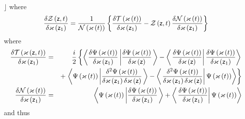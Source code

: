 $\rfloor $ where 
\begin{equation}
\frac{\delta {\cal Z}\left( {\sf z},t\right) }{\delta \varkappa \left( {\sf z%
}_{1}\right) }=\frac{1}{{\cal N}\left( {\cal \varkappa }\left( t\right)
\right) }\left\{ \frac{\delta {\cal T}\left( \varkappa \left( t\right)
\right) }{\delta \varkappa \left( {\sf z}_{1}\right) }-{\cal Z}\left( {\sf z}%
,t\right) \frac{\delta {\cal N}\left( \varkappa \left( t\right) \right) }{%
\delta \varkappa \left( {\sf z}_{1}\right) }\right\} 
\end{equation}%
where 
\begin{eqnarray}
\frac{\delta {\cal T}\left( \varkappa \left( {\sf z},t\right) \right) }{%
\delta \varkappa \left( {\sf z}_{1}\right) } &=&\frac{i}{2}\left\{
\left\langle \frac{\delta \Psi \left( {\cal \varkappa }\left( t\right)
\right) }{\delta {\cal \varkappa }\left( {\sf z}_{1}\right) }\left| \frac{%
\delta \Psi \left( {\cal \varkappa }\left( t\right) \right) }{\delta {\cal %
\varkappa }\left( {\sf z}\right) }\right. \right\rangle -\left\langle \left. 
\frac{\delta \Psi \left( {\cal \varkappa }\left( t\right) \right) }{\delta 
{\cal \varkappa }\left( {\sf z}\right) }\right| \frac{\delta \Psi \left( 
{\cal \varkappa }\left( t\right) \right) }{\delta {\cal \varkappa }\left( 
{\sf z}_{1}\right) }\right\rangle \right.  \\
&&+\left. \left\langle \Psi \left( {\cal \varkappa }\left( t\right) \right)
\left| \frac{\delta ^{2}\Psi \left( {\cal \varkappa }\left( t\right) \right) 
}{\delta {\cal \varkappa }\left( {\sf z}_{1}\right) \delta {\cal \varkappa }%
\left( {\sf z}\right) }\right. \right\rangle -\left\langle \left. \frac{%
\delta ^{2}\Psi \left( {\cal \varkappa }\left( t\right) \right) }{\delta 
{\cal \varkappa }\left( {\sf z}_{1}\right) \delta {\cal \varkappa }\left( 
{\sf z}\right) }\right| \Psi \left( {\cal \varkappa }\left( t\right) \right)
\right\rangle \right\}  \\
\frac{\delta {\cal N}\left( \varkappa \left( t\right) \right) }{\delta
\varkappa \left( {\sf z}_{1}\right) } &=&\left\langle \Psi \left( {\cal %
\varkappa }\left( t\right) \right) \left| \frac{\delta \Psi \left( {\cal %
\varkappa }\left( t\right) \right) }{\delta {\cal \varkappa }\left( {\sf z}%
_{1}\right) }\right. \right\rangle +\left\langle \left. \frac{\delta \Psi
\left( {\cal \varkappa }\left( t\right) \right) }{\delta {\cal \varkappa }%
\left( {\sf z}_{1}\right) }\right| \Psi \left( {\cal \varkappa }\left(
t\right) \right) \right\rangle 
\end{eqnarray}%
and thus%
